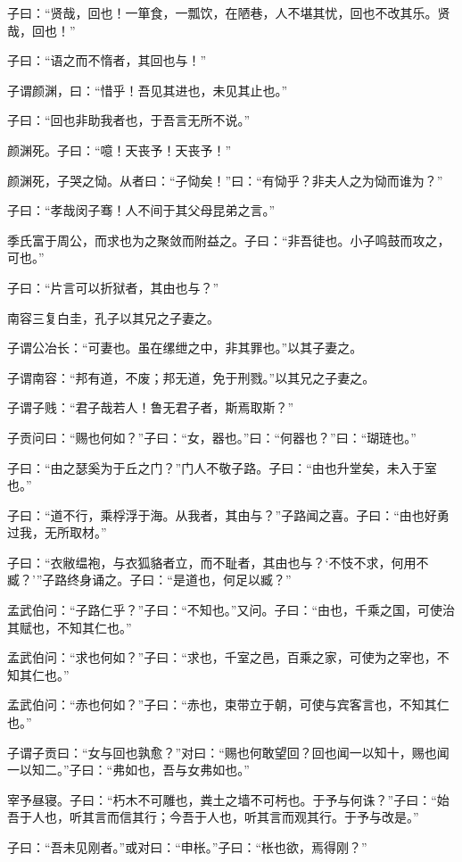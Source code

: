 \documentclass[a5paper]{ctexbook}
\begin{document}
    子曰：“贤哉，回也！一箪食，一瓢饮，在陋巷，人不堪其忧，回也不改其乐。贤哉，回也！”

    子曰：“语之而不惰者，其回也与！”

    子谓颜渊，曰：“惜乎！吾见其进也，未见其止也。”

    子曰：“回也非助我者也，于吾言无所不说。”

    颜渊死。子曰：“噫！天丧予！天丧予！”

    颜渊死，子哭之恸。从者曰：“子恸矣！”曰：“有恸乎？非夫人之为恸而谁为？”

    子曰：“孝哉闵子骞！人不间于其父母昆弟之言。”

    季氏富于周公，而求也为之聚敛而附益之。子曰：“非吾徒也。小子鸣鼓而攻之，可也。”

    子曰：“片言可以折狱者，其由也与？”

    南容三复白圭，孔子以其兄之子妻之。

    子谓公冶长：“可妻也。虽在缧绁之中，非其罪也。”以其子妻之。

    子谓南容：“邦有道，不废；邦无道，免于刑戮。”以其兄之子妻之。

    子谓子贱：“君子哉若人！鲁无君子者，斯焉取斯？”

    子贡问曰：“赐也何如？”子曰：“女，器也。”曰：“何器也？”曰：“瑚琏也。”

    子曰：“由之瑟奚为于丘之门？”门人不敬子路。子曰：“由也升堂矣，未入于室也。”

    子曰：“道不行，乘桴浮于海。从我者，其由与？”子路闻之喜。子曰：“由也好勇过我，无所取材。”

    子曰：“衣敝缊袍，与衣狐貉者立，而不耻者，其由也与？‘不忮不求，何用不臧？’”子路终身诵之。子曰：“是道也，何足以臧？”

    孟武伯问：“子路仁乎？”子曰：“不知也。”又问。子曰：“由也，千乘之国，可使治其赋也，不知其仁也。”
    
    孟武伯问：“求也何如？”子曰：“求也，千室之邑，百乘之家，可使为之宰也，不知其仁也。”
    
    孟武伯问：“赤也何如？”子曰：“赤也，束带立于朝，可使与宾客言也，不知其仁也。”

    子谓子贡曰：“女与回也孰愈？”对曰：“赐也何敢望回？回也闻一以知十，赐也闻一以知二。”子曰：“弗如也，吾与女弗如也。”

    宰予昼寝。子曰：“朽木不可雕也，粪土之墙不可杇也。于予与何诛？”子曰：“始吾于人也，听其言而信其行；今吾于人也，听其言而观其行。于予与改是。”

    子曰：“吾未见刚者。”或对曰：“申枨。”子曰：“枨也欲，焉得刚？”
\end{document}
